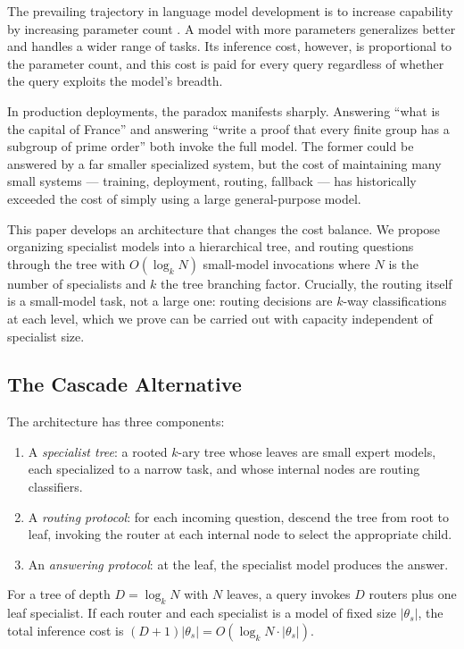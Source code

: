 \documentclass[11pt,twocolumn,a4paper]{article}
\theoremstyle{definition}
\theoremstyle{remark}
\begin{document}
The prevailing trajectory in language model development is to increase capability by increasing parameter count \citep{kaplan2020scaling, hoffmann2022training}. A model with more parameters generalizes better and handles a wider range of tasks. Its inference cost, however, is proportional to the parameter count, and this cost is paid for every query regardless of whether the query exploits the model's breadth.

In production deployments, the paradox manifests sharply. Answering ``what is the capital of France'' and answering ``write a proof that every finite group has a subgroup of prime order'' both invoke the full model. The former could be answered by a far smaller specialized system, but the cost of maintaining many small systems --- training, deployment, routing, fallback --- has historically exceeded the cost of simply using a large general-purpose model.

This paper develops an architecture that changes the cost balance. We propose organizing specialist models into a hierarchical tree, and routing questions through the tree with $O(\log_k N)$ small-model invocations where $N$ is the number of specialists and $k$ the tree branching factor. Crucially, the routing itself is a small-model task, not a large one: routing decisions are $k$-way classifications at each level, which we prove can be carried out with capacity independent of specialist size.

\subsection{The Cascade Alternative}

The architecture has three components:

\begin{enumerate}
    \item A \emph{specialist tree}: a rooted $k$-ary tree whose leaves are small expert models, each specialized to a narrow task, and whose internal nodes are routing classifiers.
    \item A \emph{routing protocol}: for each incoming question, descend the tree from root to leaf, invoking the router at each internal node to select the appropriate child.
    \item An \emph{answering protocol}: at the leaf, the specialist model produces the answer.
\end{enumerate}

For a tree of depth $D = \log_k N$ with $N$ leaves, a query invokes $D$ routers plus one leaf specialist. If each router and each specialist is a model of fixed size $|\theta_s|$, the total inference cost is $(D + 1) |\theta_s| = O(\log_k N \cdot |\theta_s|)$.
\end{document}
